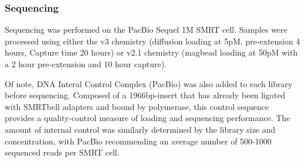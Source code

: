 \subsubsection{Sequencing} 
\label{section:ch2_sequencing}
Sequencing was performed on the PacBio Sequel 1M SMRT cell. Samples were processed using either the v3 chemistry (diffusion loading at 5pM, pre-extension 4 hours, Capture time 20 hours) or v2.1 chemistry (magbead loading at 50pM with a 2 hour pre-extension and 10 hour capture).

Of note, DNA Interal Control Complex (PacBio) was also added to each library before sequencing. Composed of a 1966bp-insert that has already been ligated with SMRTbell adapters and bound by polymerase, this control sequence provides a quality-control measure of loading and sequencing performance. The amount of internal control was similarly determined by the library size and concentration, with PacBio recommending an average number of 500-1000 sequenced reads per SMRT cell.     

